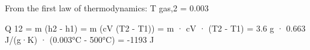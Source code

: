 From the first law of thermodynamics:  
T gas,2 = 0.003  

Q 12 = m (h2 - h1)  
= m (cV (T2 - T1))  
= m · cV · (T2 - T1)  
= 3.6 g · 0.663 J/(g·K) · (0.003°C - 500°C)  
= -1193 J
